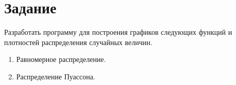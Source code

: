 \chapter{Задание}

Разработать программу для построения графиков следующих функций и плотностей распределения 
случайных величин.
\begin{enumerate}
    \item Равномерное распределение.
    \item Распределение Пуассона.
\end{enumerate}
